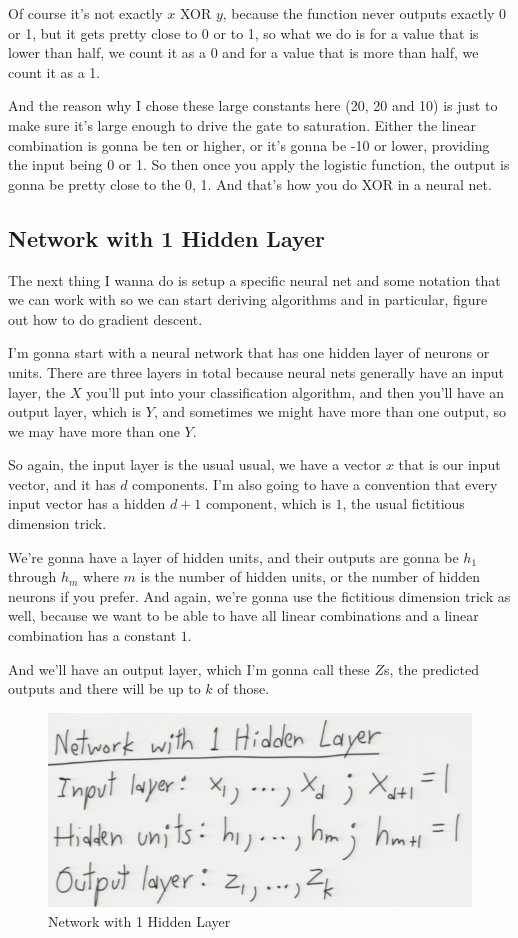 \documentclass[fleqn,10pt]{olplainarticle}
\theoremstyle{definition}
\theoremstyle{remark}
\begin{document}
Of course it's not exactly $x$ XOR $y$, because the function never outputs exactly 0 or 1, but it gets pretty close to 0 or to 1, so what we do is for a value that is lower than half, we count it as a 0 and for a value that is more than half, we count it as a 1. 

And the reason why I chose these large constants here (20, 20 and 10) is just to make sure it's large enough to drive the gate to saturation. Either the linear combination is gonna be ten or higher, or it's gonna be -10 or lower, providing the input being 0 or 1. So then once you apply the logistic function, the output is gonna be pretty close to the 0, 1. And that's how you do XOR in a neural net.

\subsection*{Network with 1 Hidden Layer}
The next thing I wanna do is setup a specific neural net and some notation that we can work with so we can start deriving algorithms and in particular, figure out how to do gradient descent. 

I'm gonna start with a neural network that has one hidden layer of neurons or units. There are three layers in total because neural nets generally have  an input layer, the $X$ you'll put into your classification algorithm, and then you'll have an output layer, which is $Y$, and sometimes we might have more than one output, so we may have more than one $Y$. 

So again, the input layer is the usual usual, we have a vector $x$ that is our input vector, and it has ${d}$ components. I'm also going to have a convention that every input vector has a hidden ${d+1}$ component, which is ${1}$, the usual fictitious dimension trick.

We're gonna have a layer of hidden units, and their outputs are gonna be ${h_1}$ through ${h_m}$ where ${m}$ is the number of hidden units, or the number of hidden neurons if you prefer. And again, we're gonna use the fictitious dimension trick as well, because we want to be able to have all linear combinations and a linear combination has a constant $1$. 

And we'll have an output layer, which I'm gonna call these $Z$s, the predicted outputs and there will be up to $k$ of those.
\begin{figure}[ht]
\centering
\includegraphics[width=0.7\linewidth]{images/nn_with_1_hidden_layer}
\caption{Network with 1 Hidden Layer}
\label{fig:nn_with_1_hidden_layer}
\end{figure}
\end{document}
